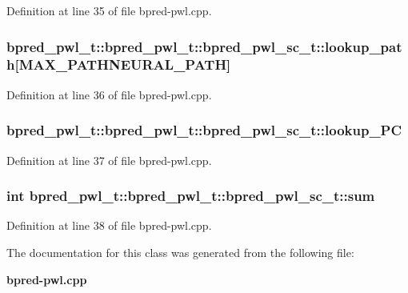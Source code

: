 Definition at line 35 of file bpred-pwl.cpp.
\subsubsection[{lookup\_\-path}]{ bpred\_\-pwl\_\-t::bpred\_\-pwl\_\-t::bpred\_\-pwl\_\-sc\_\-t::lookup\_\-path[MAX\_\-PATHNEURAL\_\-PATH]}\label{classbpred__pwl__t_1_1bpred__pwl__sc__t_b42644d7e2ca110228d764ff2d9f3349}




Definition at line 36 of file bpred-pwl.cpp.
\subsubsection[{lookup\_\-PC}]{ bpred\_\-pwl\_\-t::bpred\_\-pwl\_\-t::bpred\_\-pwl\_\-sc\_\-t::lookup\_\-PC}\label{classbpred__pwl__t_1_1bpred__pwl__sc__t_49320135f125e6dded4cc9df7aefe3ca}




Definition at line 37 of file bpred-pwl.cpp.
\subsubsection[{sum}]{\setlength{\rightskip}{0pt plus 5cm}int bpred\_\-pwl\_\-t::bpred\_\-pwl\_\-t::bpred\_\-pwl\_\-sc\_\-t::sum}\label{classbpred__pwl__t_1_1bpred__pwl__sc__t_fb5786742ec14db257a991449d71bb7d}




Definition at line 38 of file bpred-pwl.cpp.

The documentation for this class was generated from the following file:\begin{CompactItemize}
\item 
{\bf bpred-pwl.cpp}\end{CompactItemize}
